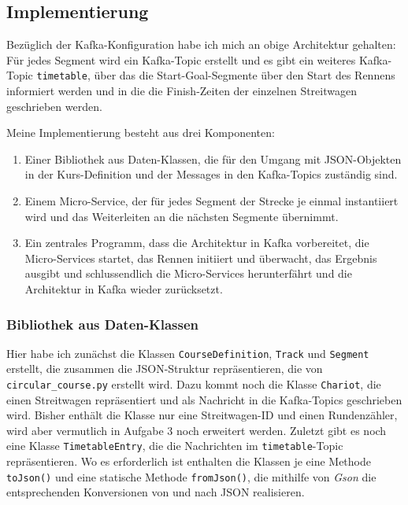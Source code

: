 \documentclass[12pt]{article}
\begin{document}
\subsection*{Implementierung}
Bezüglich der Kafka-Konfiguration habe ich mich an obige Architektur gehalten: Für jedes Segment wird ein Kafka-Topic erstellt und es gibt ein weiteres Kafka-Topic \texttt{timetable}, über das die Start-Goal-Segmente über den Start des Rennens informiert werden und in die die Finish-Zeiten der einzelnen Streitwagen geschrieben werden.

Meine Implementierung besteht aus drei Komponenten: 
\begin{enumerate}
	\item Einer Bibliothek aus Daten-Klassen, die für den Umgang mit JSON-Objekten in der Kurs-Definition und der Messages in den Kafka-Topics zuständig sind.
	\item Einem Micro-Service, der für jedes Segment der Strecke je einmal instantiiert wird und das Weiterleiten an die nächsten Segmente übernimmt.
	\item Ein zentrales Programm, dass die Architektur in Kafka vorbereitet, die Micro-Services startet, das Rennen initiiert und überwacht, das Ergebnis ausgibt und schlussendlich die Micro-Services herunterfährt und die Architektur in Kafka wieder zurücksetzt.
\end{enumerate}

\subsubsection*{Bibliothek aus Daten-Klassen}
Hier habe ich zunächst die Klassen \texttt{CourseDefinition}, \texttt{Track} und \texttt{Segment} erstellt, die zusammen die JSON-Struktur repräsentieren, die von \texttt{circular\_course.py} erstellt wird.
Dazu kommt noch die Klasse \texttt{Chariot}, die einen Streitwagen repräsentiert und als Nachricht in die Kafka-Topics geschrieben wird.
Bisher enthält die Klasse nur eine Streitwagen-ID und einen Rundenzähler, wird aber vermutlich in Aufgabe 3 noch erweitert werden.
Zuletzt gibt es noch eine Klasse \texttt{TimetableEntry}, die die Nachrichten im \texttt{timetable}-Topic repräsentieren.
Wo es erforderlich ist enthalten die Klassen je eine Methode \texttt{toJson()} und eine statische Methode \texttt{fromJson()}, die mithilfe von \emph{Gson} die entsprechenden Konversionen von und nach JSON realisieren.
\end{document}
